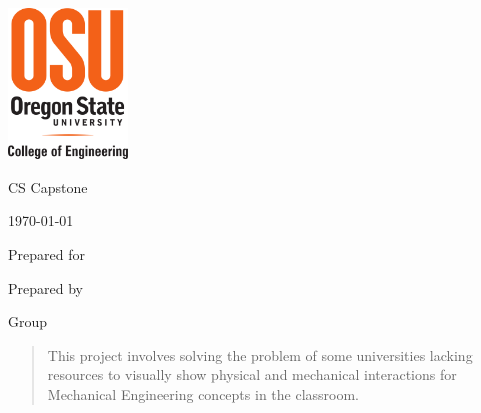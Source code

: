 \begin{titlepage}
    \begin{singlespace}
    	\includegraphics[height=4cm]{coe_v_spot1}
        \hfill 
        \par\vspace{.2in}
        \centering
        \scshape{
            \huge CS Capstone \DocType \par
            {\large\today}\par
            \vspace{.5in}
            \textbf{\Huge\CapstoneProjectName}\par
            \vfill
            {\large Prepared for}\par
            \Huge \CapstoneSponsorCompany\par
            \vspace{5pt}
            {\Large
                \NameSigPair{\CapstoneSponsorPersonOne}\par
                \NameSigPair{\CapstoneSponsorPersonTwo}\par
            }
            {\large Prepared by }\par
            Group\CapstoneTeamNumber\par
            \CapstoneTeamName\par 
            \vspace{5pt}
            {\Large
                \NameSigPair{\GroupMemberOne}\par
                \NameSigPair{\GroupMemberTwo}\par
                \NameSigPair{\GroupMemberThree}\par
            }
            \vspace{20pt}
        }
        \begin{abstract}
This project involves solving the problem of some universities lacking resources to visually show physical and mechanical interactions for Mechanical Engineering concepts in the classroom.

\end{abstract}
\end{singlespace}
\end{titlepage}
